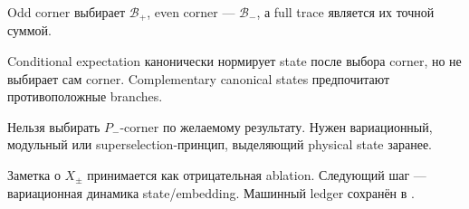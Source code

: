 Odd corner выбирает \(\mathcal B_+\), even corner --- \(\mathcal B_-\), а
full trace является их точной суммой.

\begin{theorem}
Conditional expectation канонически нормирует state после выбора corner, но
не выбирает сам corner. Complementary canonical states предпочитают
противоположные branches.
\end{theorem}

\begin{nogocriterion}
Нельзя выбирать \(P_-\)-corner по желаемому результату. Нужен вариационный,
модульный или superselection-принцип, выделяющий physical state заранее.
\end{nogocriterion}

Заметка о \(X_\pm\) принимается как отрицательная ablation. Следующий шаг ---
вариационная динамика state/embedding. Машинный ledger сохранён в
.